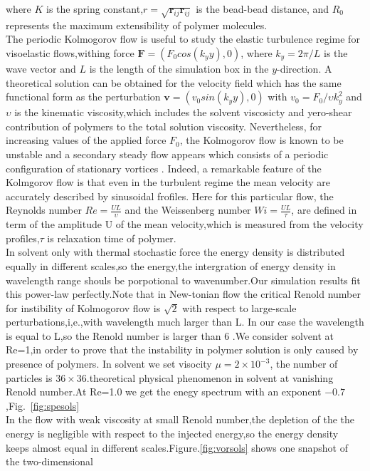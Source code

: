 \documentclass[aps,pre,twocolumn,showpacs,superscriptaddress,groupedaddress]{revtex4}  %
\begin{document}
where $K$ is the spring constant,$r=\sqrt{\mathbf{r}_{ij}\mathbf{r}_{ij}}$ is the bead-bead
distance, and $R_0$ represents the maximum extensibility of polymer molecules.\\
The periodic Kolmogorov flow is useful to study the elastic turbulence regime for visoelastic flows,withing force $\mathbf{F}=(F_0cos(k_yy),0)$,
where $k_y= 2\pi/L$ is the wave vector and $L$ is the length of the simulation box in the $y$-direction. A theoretical solution can be obtained for the 
velocity field which has the same functional form as the perturbation $\mathbf{v}=(v_0sin(k_yy),0)$
with $ v_0=F_0/\upsilon k_{y}^{2}$ and $\upsilon$ is the kinematic viscosity,which includes the solvent viscosicty and yero-shear contribution of polymers to the total solution viscosity. Nevertheless, for increasing values of the applied force $F_0$,
the Kolmogorov flow is known to be unstable and a secondary steady flow appears which consists of a periodic configuration of stationary vortices \cite{posch97}.
Indeed, a remarkable feature of the Kolmgorov flow is that even in the turbulent regime the mean velocity are accurately described by sinusoidal frofiles\cite{boffetta05}.
Here for this particular flow, the Reynolds number $Re=\frac{UL}{\upsilon}$ and the Weissenberg number $Wi=\frac{UL}{\tau}$, are defined in term of the amplitude U of the mean velocity,which is 
measured from the velocity profiles,$\tau$ is relaxation time of polymer.\\
In solvent only with thermal stochastic force the energy density is distributed equally in different scales,so the energy,the intergration of energy density in wavelength range
shouls be porpotional to wavenumber.Our simulation results fit this power-law perfectly.Note that in New-tonian flow the critical Renold number for instibility of Kolmogorov flow is $\sqrt{2}$ with respect to large-scale perturbations,i,e.,with wavelength much larger than L.
In our case the wavelength is equal to L,so the Renold number is larger than $6$ \cite{posch97}.We consider solvent at Re=1,in order to prove that the instability in polymer solution is 
only caused by presence of polymers. In solvent we set visocity $\mu = 2\times10^{-3}$, the number of particles is $36\times36$.theoretical physical phenomenon in solvent at vanishing Renold number.At Re=1.0
we get the enegy spectrum with an exponent $-0.7$,Fig.~\ref{fig:spesols}\\In the flow with weak viscosity at small Renold number,the depletion of the the energy is negligible 
with respect to the injected energy,so the  energy density keeps almost equal in different scales.Figure.\ref{fig:vorsols} shows one snapshot of the two-dimensional 
\end{document}
